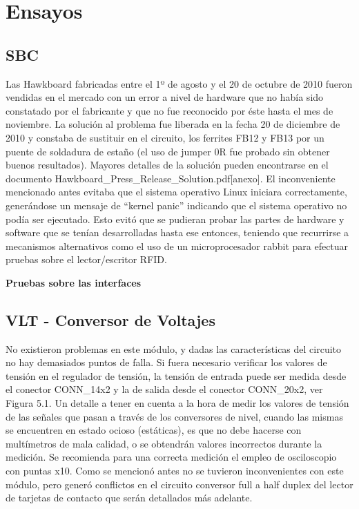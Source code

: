\chapter{Ensayos}

\section{SBC}
Las Hawkboard fabricadas entre el 1º de agosto y el 20 de octubre de 2010 fueron vendidas en el mercado con 
un error a nivel de hardware que no había sido constatado por el fabricante y que no fue reconocido por éste
hasta el mes de noviembre. La solución al problema fue liberada en la fecha 20 de diciembre de 2010 y constaba de sustituir en el circuito, los ferrites FB12 y FB13 por un puente de soldadura de estaño (el uso de jumper 0R fue probado sin obtener buenos resultados). Mayores detalles de la solución pueden encontrarse en el documento Hawkboard\_Press\_Release\_Solution.pdf[anexo].
El inconveniente mencionado antes evitaba que el sistema operativo Linux iniciara correctamente, generándose un mensaje de “kernel panic” indicando que el sistema operativo no podía ser ejecutado. Esto evitó que se pudieran probar las partes de hardware y software que se tenían desarrolladas hasta ese entonces, teniendo que recurrirse a mecanismos alternativos como el uso de un microprocesador rabbit para efectuar pruebas sobre el lector/escritor RFID.

\bigskip
\bigskip
{\bf{Pruebas sobre las interfaces}}

\section{VLT - Conversor de Voltajes}
No existieron problemas en este módulo, y dadas las características del circuito
no hay demasiados puntos de falla. Si fuera necesario verificar los valores de
tensión en el regulador de tensión, la tensión de entrada puede ser medida desde
el conector CONN\_14x2 y la de salida desde el conector CONN\_20x2, ver Figura 5.1.
Un detalle a tener en cuenta a la hora de medir los valores de tensión de las
señales que pasan a través de los conversores de nivel, cuando las mismas se 
encuentren en estado ocioso (estáticas), es que no debe hacerse con multímetros 
de mala calidad, o se obtendrán valores incorrectos durante la medición. Se 
recomienda para una correcta medición el empleo de osciloscopio con puntas x10. 
Como se mencionó antes no se tuvieron inconvenientes con este módulo, pero generó 
conflictos en el circuito conversor full a half duplex del lector de tarjetas de 
contacto que serán detallados más adelante.


